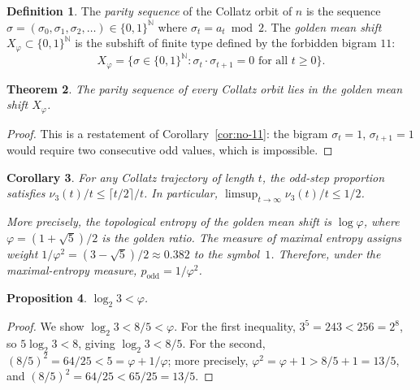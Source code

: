 \documentclass[manuscript]{aomart}
\newcommand{\N}{\mathbb{N}}
\theoremstyle{plain}
\newtheorem{theorem}{Theorem}[section]
\newtheorem{proposition}[theorem]{Proposition}
\newtheorem{corollary}[theorem]{Corollary}
\theoremstyle{definition}
\newtheorem{definition}[theorem]{Definition}
\theoremstyle{remark}
\numberwithin{equation}{section}
\begin{document}
\begin{definition}\label{def:parity-seq}
The \emph{parity sequence} of the Collatz orbit of $n$ is the
sequence $\sigma = (\sigma_0, \sigma_1, \sigma_2, \ldots) \in
\{0,1\}^{\N}$ where $\sigma_t = a_t \bmod 2$.  The \emph{golden mean
shift} $X_\varphi \subset \{0,1\}^{\N}$ is the subshift of finite
type defined by the forbidden bigram $11$:
\[
  X_\varphi = \bigl\{ \sigma \in \{0,1\}^{\N} :
  \sigma_t \cdot \sigma_{t+1} = 0 \text{ for all } t \ge 0 \bigr\}.
\]
\end{definition}

\begin{theorem}\label{thm:collatz-sft}
The parity sequence of every Collatz orbit lies in the golden mean
shift $X_\varphi$.
\end{theorem}

\begin{proof}
This is a restatement of Corollary~\ref{cor:no-11}: the bigram
$\sigma_t = 1$, $\sigma_{t+1} = 1$ would require two consecutive odd
values, which is impossible.
\end{proof}

\begin{corollary}\label{cor:p-odd-bound}
For any Collatz trajectory of length $t$, the odd-step proportion
satisfies $\nu_3(t)/t \le \lceil t/2 \rceil / t$.  In particular,
$\limsup_{t \to \infty} \nu_3(t)/t \le 1/2$.

More precisely, the topological entropy of the golden mean shift is
$\log \varphi$, where $\varphi = (1+\sqrt{5})/2$ is the golden
ratio.  The measure of maximal entropy assigns weight
$1/\varphi^2 = (3-\sqrt{5})/2 \approx 0.382$ to the symbol~$1$.
Therefore, under the maximal-entropy measure,
$p_{\mathrm{odd}} = 1/\varphi^2$.
\end{corollary}

\begin{proposition}\label{prop:log23-lt-phi}
$\log_2 3 < \varphi$.
\end{proposition}

\begin{proof}
We show $\log_2 3 < 8/5 < \varphi$.  For the first inequality,
$3^5 = 243 < 256 = 2^8$, so $5 \log_2 3 < 8$, giving
$\log_2 3 < 8/5$.  For the second, $(8/5)^2 = 64/25 < 5 = \varphi +
1/\varphi$; more precisely, $\varphi^2 = \varphi + 1 > 8/5 + 1 =
13/5$, and $(8/5)^2 = 64/25 < 65/25 = 13/5$.
\end{proof}
\end{document}
